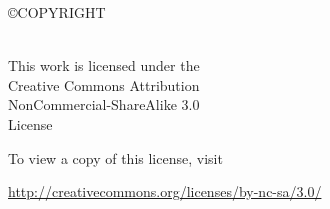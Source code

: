\documentclass[11pt]{report} %
\begin{document}

\doublespacing

\thispagestyle{empty} %

\vspace*{\fill}

\begin{flushleft}
\mytitle

 \copyright \space COPYRIGHT
 
\myyear

\myauthorfull\\[24 pt] %

This work is licensed under the \\
Creative Commons Attribution \\
NonCommercial-ShareAlike 3.0 \\
License

To view a copy of this license, visit

\url{http://creativecommons.org/licenses/by-nc-sa/3.0/}

\end{flushleft}
\pagebreak 
\end{document}
